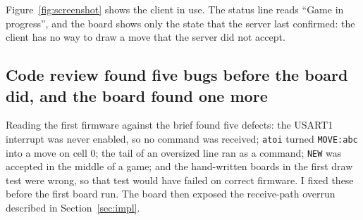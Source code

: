 Figure~\ref{fig:screenshot} shows the client in use. The status line reads ``Game
in progress'', and the board shows only the state that the server last confirmed:
the client has no way to draw a move that the server did not accept.

\subsection{Code review found five bugs before the board did, and the board found one more}
Reading the first firmware against the brief found five defects: the USART1
interrupt was never enabled, so no command was received; \texttt{atoi} turned
\texttt{MOVE:abc} into a move on cell 0; the tail of an oversized line ran as a
command; \texttt{NEW} was accepted in the middle of a game; and the hand-written
boards in the first draw test were wrong, so that test would have failed on
correct firmware. I fixed these before the first board run.
The board then exposed the receive-path overrun described in
Section~\ref{sec:impl}.
